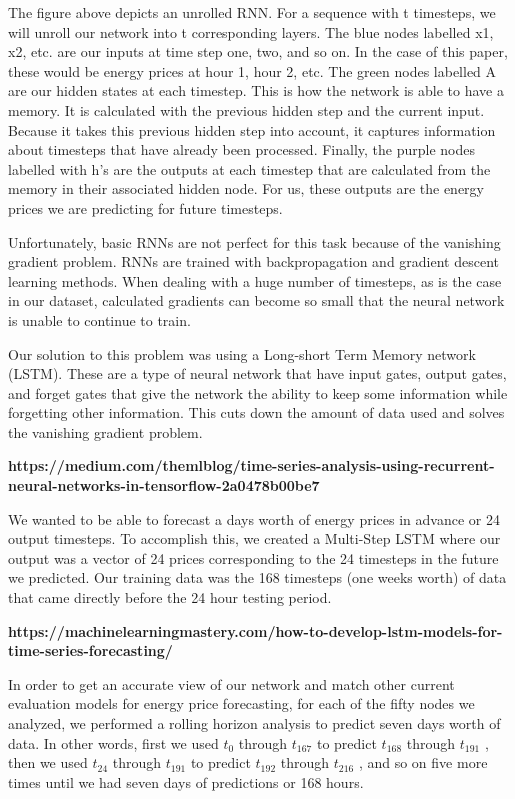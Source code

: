 \documentclass[sigconf]{acmart}
\begin{document}
The figure above depicts an unrolled RNN. For a sequence with t timesteps, we will unroll our network into t corresponding layers. The blue nodes labelled x1,  x2, etc. are our inputs at time step one, two, and so on. In the case of this paper, these would be energy prices at hour 1, hour 2, etc. The green nodes labelled A are our hidden states at each timestep. This is how the network is able to have a memory. It is calculated with the previous hidden step and the current input. Because it takes this previous hidden step into account, it captures information about timesteps that have already been processed. Finally, the purple nodes labelled with h’s are the outputs at each timestep that are calculated from the memory in their associated hidden node. For us, these outputs are the energy prices we are predicting for future timesteps. 

Unfortunately, basic RNNs are not perfect for this task because of the vanishing gradient problem. RNNs are trained with backpropagation and gradient descent learning methods. When dealing with a huge number of timesteps, as is the case in our dataset, calculated gradients can become so small that the neural network is unable to continue to train. 

Our solution to this problem was using a Long-short Term Memory network (LSTM). These are a type of neural network that have input gates, output gates, and forget gates that give the network the ability to keep some information while forgetting other information. This cuts down the amount of data used and solves the vanishing gradient problem. 

\textbf{https://medium.com/themlblog/time-series-analysis-using-recurrent-neural-networks-in-tensorflow-2a0478b00be7}

We wanted to be able to forecast a days worth of energy prices in advance or 24 output timesteps. To accomplish this, we created a Multi-Step LSTM where our output was a vector of 24 prices corresponding to the 24 timesteps in the future we predicted. Our training data was the 168 timesteps (one weeks worth) of data that came directly before the 24 hour testing period.

\textbf{https://machinelearningmastery.com/how-to-develop-lstm-models-for-time-series-forecasting/}

In order to get an accurate view of our network and match other current evaluation models for energy price forecasting, for each of the fifty nodes we analyzed, we performed a rolling horizon analysis to predict seven days worth of data. In other words, first we used $t_{0}$ through $t_{167}$ to predict $t_{168}$ through $t_{191}$ , then we used $t_{24}$ through $t_{191}$ to predict $t_{192}$ through $t_{216}$ , and so on five more times until we had seven days of predictions or 168 hours.  
\end{document}
